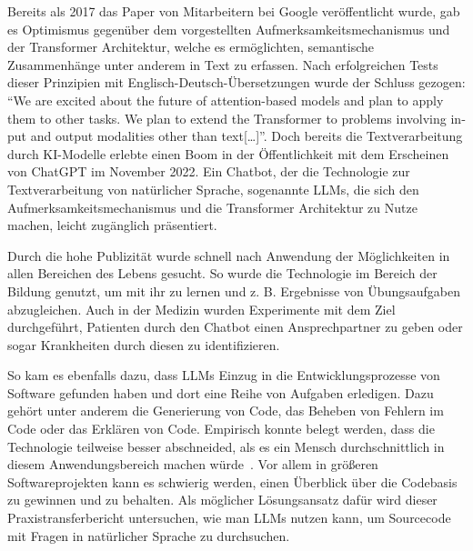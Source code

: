 \documentclass[../main.tex]{subfiles}
\begin{document}
Bereits als 2017 das Paper  von Mitarbeitern bei Google veröffentlicht wurde, gab es Optimismus gegenüber dem vorgestellten Aufmerksamkeitsmechanismus und der Transformer Architektur, welche es ermöglichten, semantische Zusammenhänge unter anderem in Text zu erfassen.
Nach erfolgreichen Tests dieser Prinzipien mit Englisch-Deutsch-Übersetzungen wurde der Schluss gezogen: \foreignquote{english}{We are excited about the future of attention-based models and plan to apply them to other tasks. We plan to extend the Transformer to problems involving input and output modalities other than text[\ldots]}\cite*{vaswani2017attention}.
Doch bereits die Textverarbeitung durch \gls{KI}-Modelle erlebte einen Boom in der Öffentlichkeit mit dem Erscheinen von ChatGPT im November 2022.
Ein Chatbot, der die Technologie zur Textverarbeitung von natürlicher Sprache, sogenannte \glspl{LLM}, die sich den Aufmerksamkeitsmechanismus und die Transformer Architektur zu Nutze machen, leicht zugänglich präsentiert.
~\cite{chatgpt2023}

Durch die hohe Publizität wurde schnell nach Anwendung der Möglichkeiten in allen Bereichen des Lebens gesucht.
So wurde die Technologie im Bereich der Bildung genutzt, um mit ihr zu lernen und z. B. Ergebnisse von Übungsaufgaben abzugleichen.
Auch in der Medizin wurden Experimente mit dem Ziel durchgeführt, Patienten durch den Chatbot einen Ansprechpartner zu geben oder sogar Krankheiten durch diesen zu identifizieren.
~\cite*{liu2023summary}

So kam es ebenfalls dazu, dass \glspl{LLM} Einzug in die Entwicklungsprozesse von Software gefunden haben und dort eine Reihe von Aufgaben erledigen.
Dazu gehört unter anderem die Generierung von Code, das Beheben von Fehlern im Code oder das Erklären von Code.
Empirisch konnte belegt werden, dass die Technologie teilweise besser abschneided, als es ein Mensch durchschnittlich in diesem Anwendungsbereich machen würde~\cite*{tian2023chatgpt}.
Vor allem in größeren Softwareprojekten kann es schwierig werden, einen Überblick über die Codebasis zu gewinnen und zu behalten.
Als möglicher Lösungsansatz dafür wird dieser Praxistransferbericht untersuchen, wie man \glspl{LLM} nutzen kann, um Sourcecode mit Fragen in natürlicher Sprache zu durchsuchen.
\end{document}
